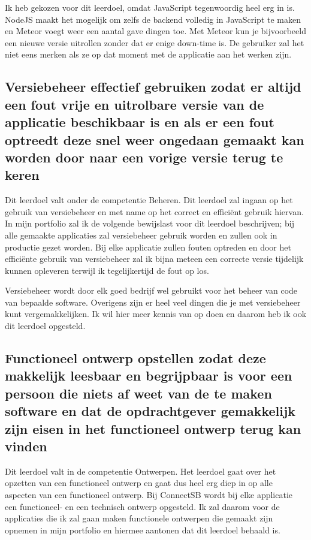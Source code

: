 \documentclass{article}
\begin{document}
Ik heb gekozen voor dit leerdoel, omdat JavaScript tegenwoordig heel erg in is. NodeJS maakt het mogelijk om zelfs de backend volledig in JavaScript te maken en Meteor voegt weer een aantal gave dingen toe. Met Meteor kun je bijvoorbeeld een nieuwe versie uitrollen zonder dat er enige down-time is. De gebruiker zal het niet eens merken als ze op dat moment met de applicatie aan het werken zijn. 

\subsection{Versiebeheer effectief gebruiken zodat er altijd een fout vrije en uitrolbare versie van de applicatie beschikbaar is en als er een fout optreedt deze snel weer ongedaan gemaakt kan worden door naar een vorige versie terug te keren}
Dit leerdoel valt onder de competentie Beheren. Dit leerdoel zal ingaan op het gebruik van versiebeheer en met name op het correct en efficiënt gebruik hiervan. In mijn portfolio zal ik de volgende bewijslast voor dit leerdoel beschrijven; bij alle gemaakte applicaties zal versiebeheer gebruik worden en zullen ook in productie gezet worden. Bij elke applicatie zullen fouten optreden en door het efficiënte gebruik van versiebeheer zal ik bijna meteen een correcte versie tijdelijk kunnen opleveren terwijl ik tegelijkertijd de fout op los.

Versiebeheer wordt door elk goed bedrijf wel gebruikt voor het beheer van code van bepaalde software. Overigens zijn er heel veel dingen die je met versiebeheer kunt vergemakkelijken. Ik wil hier meer kennis van op doen en daarom heb ik ook dit leerdoel opgesteld.

\subsection{Functioneel ontwerp opstellen zodat deze makkelijk leesbaar en begrijpbaar is voor een persoon die niets af weet van de te maken software en dat de opdrachtgever gemakkelijk zijn eisen in het functioneel ontwerp terug kan vinden}
Dit leerdoel valt in de competentie Ontwerpen. Het leerdoel gaat over het opzetten van een functioneel ontwerp en gaat dus heel erg diep in op alle aspecten van een functioneel ontwerp. Bij ConnectSB wordt bij elke applicatie een functioneel- en een technisch ontwerp opgesteld. Ik zal daarom voor de applicaties die ik zal gaan maken functionele ontwerpen die gemaakt zijn opnemen in mijn portfolio en hiermee aantonen dat dit leerdoel behaald is.
\end{document}
